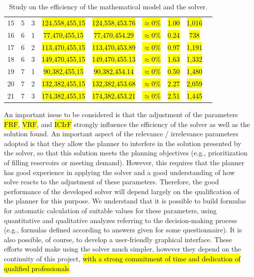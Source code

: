 \documentclass{singlecol}
\theoremstyle{TH}{
\newtheorem{lemma}{Lemma}
\newtheorem{theorem}[lemma]{Theorem}
\newtheorem{corrolary}[lemma]{Corrolary}
\newtheorem{conjecture}[lemma]{Conjecture}
\newtheorem{proposition}[lemma]{Proposition}
\newtheorem{claim}[lemma]{Claim}
\newtheorem{stheorem}[lemma]{Wrong Theorem}
\newtheorem{algorithm}{Algorithm}
}
\theoremstyle{THrm}{
\newtheorem{definition}{Definition}[section]
\newtheorem{question}{Question}[section]
\newtheorem{remark}{Remark}
\newtheorem{scheme}{Scheme}
}
\theoremstyle{THhit}{
\newtheorem{case}{Case}[section]
}
\begin{document}
\begin{table}[h]
\begin{center}
\begin{small}
\begin{tabular}{ c c c c c c c c c }
	 15  &  5 & 3  & \hl{124,558,455,15} & \hl{124,558,453.76} & \hl{$\approx 0\%$} &  \hl{1.00}   &   \hl{1,016}       \\
	 16  &  6 & 1  & \hl{77,470,455,15} & \hl{77,470,454.29}  & \hl{$\approx 0\%$}  &  \hl{0.24}   &   \hl{738}       \\
	 17  &  6 & 2  & \hl{113,470,455,15} & \hl{113,470,453.89}  & \hl{$\approx 0\%$} &  \hl{0.97}   &   \hl{1,191}      \\
	 18  &  6 & 3  & \hl{149,470,455,15} & \hl{149,470,455.13}  & \hl{$\approx 0\%$} & \hl{1.63}   &   \hl{1,332}     \\
	 19  &  7 & 1  & \hl{90,382,455,15}  & \hl{90,382,454.14}  & \hl{$\approx 0\%$} &  \hl{0.50}   &  \hl{1,480}       \\
	 20  &  7 & 2  & \hl{132,382,455,15} & \hl{132,382,453.68}  & \hl{$\approx 0\%$}  &  \hl{2.27}   &  \hl{2,059}      \\
	 21  &  7 & 3  & \hl{174,382,455,15} & \hl{174,382,453.21}  & \hl{$\approx 0\%$}  &  \hl{2.51}   &  \hl{1,445}      \\
	
	\end{tabular}
\caption{Study on the efficiency of the mathematical model and the solver.}
\label{tab:lingoEvaluation}
\end{small}
\end{center}
\end{table}

An important issue to be considered is that the adjustment of the parameters \hl{$\mathrm{FRF}$}, \hl{$\mathrm{VRF}$}, and \hl{$\mathrm{ICIrF}$} strongly influence the efficiency of the solver as well as the solution found. An important aspect of the relevance / irrelevance parameters adopted is that they allow the planner to interfere in the solution presented by the solver, so that this solution meets the planning objectives (e.g., prioritization of filling reservoirs or meeting demand). However, this requires that the planner has good experience in applying the solver and a good understanding of how solve reacts to the adjustment of these parameters. Therefore, the good performance of the developed solver will depend largely on the qualification of the planner for this purpose. We understand that it is possible to build formulas for automatic calculation of suitable values for these parameters, using quantitative and qualitative analyzes referring to the decision-making process (e.g., formulas defined according to answers given for some questionnaire). It is also possible, of course, to develop a user-friendly graphical interface. These efforts would make using the solver much simpler, however they depend on the continuity of this project, \hl{with a strong commitment of time and dedication of qualified professionals}.
\end{document}
